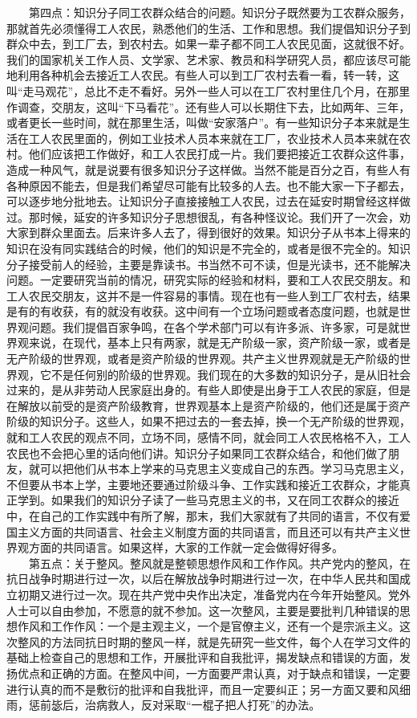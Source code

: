 \documentclass[cn,11pt,chinese]{elegantbook}
\begin{document}
　　第四点：知识分子同工农群众结合的问题。知识分子既然要为工农群众服务，那就首先必须懂得工人农民，熟悉他们的生活、工作和思想。我们提倡知识分子到群众中去，到工厂去，到农村去。如果一辈子都不同工人农民见面，这就很不好。我们的国家机关工作人员、文学家、艺术家、教员和科学研究人员，都应该尽可能地利用各种机会去接近工人农民。有些人可以到工厂农村去看一看，转一转，这叫“走马观花”，总比不走不看好。另外一些人可以在工厂农村里住几个月，在那里作调查，交朋友，这叫“下马看花”。还有些人可以长期住下去，比如两年、三年，或者更长一些时间，就在那里生活，叫做“安家落户”。有一些知识分子本来就是生活在工人农民里面的，例如工业技术人员本来就在工厂，农业技术人员本来就在农村。他们应该把工作做好，和工人农民打成一片。我们要把接近工农群众这件事，造成一种风气，就是说要有很多知识分子这样做。当然不能是百分之百，有些人有各种原因不能去，但是我们希望尽可能有比较多的人去。也不能大家一下子都去，可以逐步地分批地去。让知识分子直接接触工人农民，过去在延安时期曾经这样做过。那时候，延安的许多知识分子思想很乱，有各种怪议论。我们开了一次会，劝大家到群众里面去。后来许多人去了，得到很好的效果。知识分子从书本上得来的知识在没有同实践结合的时候，他们的知识是不完全的，或者是很不完全的。知识分子接受前人的经验，主要是靠读书。书当然不可不读，但是光读书，还不能解决问题。一定要研究当前的情况，研究实际的经验和材料，要和工人农民交朋友。和工人农民交朋友，这并不是一件容易的事情。现在也有一些人到工厂农村去，结果是有的有收获，有的就没有收获。这中间有一个立场问题或者态度问题，也就是世界观问题。我们提倡百家争鸣，在各个学术部门可以有许多派、许多家，可是就世界观来说，在现代，基本上只有两家，就是无产阶级一家，资产阶级一家，或者是无产阶级的世界观，或者是资产阶级的世界观。共产主义世界观就是无产阶级的世界观，它不是任何别的阶级的世界观。我们现在的大多数的知识分子，是从旧社会过来的，是从非劳动人民家庭出身的。有些人即使是出身于工人农民的家庭，但是在解放以前受的是资产阶级教育，世界观基本上是资产阶级的，他们还是属于资产阶级的知识分子。这些人，如果不把过去的一套去掉，换一个无产阶级的世界观，就和工人农民的观点不同，立场不同，感情不同，就会同工人农民格格不入，工人农民也不会把心里的话向他们讲。知识分子如果同工农群众结合，和他们做了朋友，就可以把他们从书本上学来的马克思主义变成自己的东西。学习马克思主义，不但要从书本上学，主要地还要通过阶级斗争、工作实践和接近工农群众，才能真正学到。如果我们的知识分子读了一些马克思主义的书，又在同工农群众的接近中，在自己的工作实践中有所了解，那末，我们大家就有了共同的语言，不仅有爱国主义方面的共同语言、社会主义制度方面的共同语言，而且还可以有共产主义世界观方面的共同语言。如果这样，大家的工作就一定会做得好得多。\\
　　第五点：关于整风。整风就是整顿思想作风和工作作风。共产党内的整风，在抗日战争时期进行过一次，以后在解放战争时期进行过一次，在中华人民共和国成立初期又进行过一次。现在共产党中央作出决定，准备党内在今年开始整风。党外人士可以自由参加，不愿意的就不参加。这一次整风，主要是要批判几种错误的思想作风和工作作风：一个是主观主义，一个是官僚主义，还有一个是宗派主义。这次整风的方法同抗日时期的整风一样，就是先研究一些文件，每个人在学习文件的基础上检查自己的思想和工作，开展批评和自我批评，揭发缺点和错误的方面，发扬优点和正确的方面。在整风中间，一方面要严肃认真，对于缺点和错误，一定要进行认真的而不是敷衍的批评和自我批评，而且一定要纠正；另一方面又要和风细雨，惩前毖后，治病救人，反对采取“一棍子把人打死”的办法。\\
\end{document}
